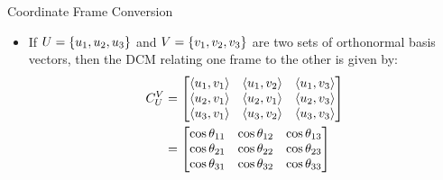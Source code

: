 \begin{frame}
Coordinate Frame Conversion
\begin{itemize}
  \item If $U=\left\{u_1,u_2,u_3\right\}$ and $V=\left\{v_1,v_2,v_3\right\}$ are two sets of orthonormal basis vectors, then the DCM relating one frame to the other is given by:
\begin{align*}
C_{U}^{V}&=
\begin{bmatrix}
\left<u_1,v_1\right> & \left<u_1,v_2\right> & \left<u_1,v_3\right>\\
\left<u_2,v_1\right> & \left<u_2,v_1\right> & \left<u_2,v_3\right>\\
\left<u_3,v_1\right> & \left<u_3,v_2\right> & \left<u_3,v_3\right>\\
\end{bmatrix}\\
&=
\begin{bmatrix}
\cos\theta_{11} & \cos\theta_{12} & \cos\theta_{13}\\
\cos\theta_{21} & \cos\theta_{22} & \cos\theta_{23}\\
\cos\theta_{31} & \cos\theta_{32} & \cos\theta_{33}\\
\end{bmatrix}
\end{align*}
\end{itemize} 
\end{frame}

